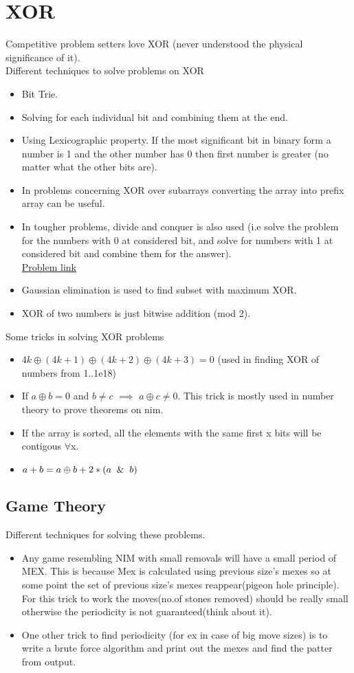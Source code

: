 \documentclass[../Notes.tex]{subfiles}
\begin{document}
\chapter{XOR}
Competitive problem setters love XOR (never understood the physical significance of it).\\

Different techniques to solve problems on XOR
\begin{itemize}
	\item Bit Trie.
	\item Solving for each individual bit and combining them at the end.
	\item Using Lexicographic property. If the most significant bit in binary form a number is 1 and the other number has 0 then first number is greater (no matter what the other bits are).
	\item In problems concerning XOR over subarrays converting the array into prefix array can be useful.
	\item In tougher problems, divide and conquer is also used (i.e solve the problem for the numbers with 0 at considered bit, and solve for numbers with 1 at considered bit and combine them for the answer).\\
	\href{https://www.codechef.com/MARCH12/problems/XOR/}{Problem link}
	\item Gaussian elimination is used to find subset with maximum XOR.
	\item XOR of two numbers is just bitwise addition (mod 2).
\end{itemize}

Some tricks in solving XOR problems
\begin{itemize}
	\item $4k\oplus(4k+1)\oplus(4k+2)\oplus(4k+3)=0$ (used in finding XOR of numbers from 1..1e18)
	\item If $a\oplus b=0$ and $b\neq c$ $\implies$ $a\oplus c\neq0$. This trick is mostly used in number theory to prove theorems on nim.
	\item If the array is sorted, all the elements with the same first x bits will be contigous $\forall$x.
	\item $a+b=a\oplus b + 2*(a\And b)$
\end{itemize}

\section{Game Theory}
Different techniques for solving these problems.
\begin{itemize}
	\item Any game resembling NIM with small removals will have a small period of MEX. This is because Mex is calculated using previous size's mexes so at some point the set of previous size's mexes reappear(pigeon hole principle). For this trick to work the moves(no.of stones removed) should be really small otherwise the periodicity is not guaranteed(think about it).
	\item One other trick to find periodicity (for ex in case of big move sizes) is to write a brute force algorithm and print out the mexes and find the patter from output.
\end{itemize}
\end{document}
